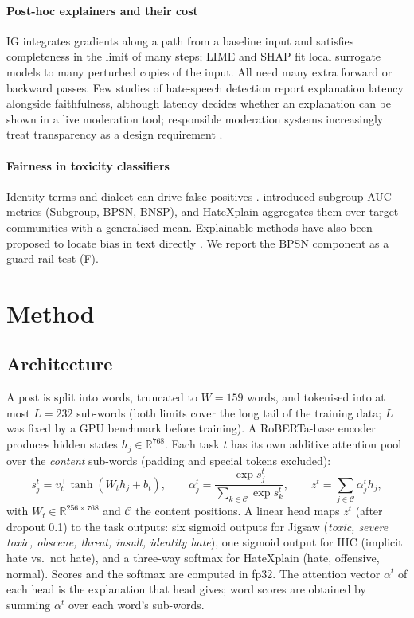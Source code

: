 \documentclass[preprint,12pt,authoryear]{elsarticle}
\begin{document}
\paragraph{Post-hoc explainers and their cost}
IG \citep{sundararajan2017axiomatic} integrates gradients along a path from a baseline input and satisfies completeness in the limit of many steps; LIME \citep{ribeiro2016lime} and SHAP \citep{lundberg2017unified} fit local surrogate models to many perturbed copies of the input. All need many extra forward or backward passes. Few studies of hate-speech detection report explanation latency alongside faithfulness, although latency decides whether an explanation can be shown in a live moderation tool; responsible moderation systems increasingly treat transparency as a design requirement \citep{asante2026responsible}.

\paragraph{Fairness in toxicity classifiers}
Identity terms and dialect can drive false positives \citep{dixon2018measuring,sap2019risk}. \citet{borkan2019nuanced} introduced subgroup AUC metrics (Subgroup, BPSN, BNSP), and HateXplain aggregates them over target communities with a generalised mean. Explainable methods have also been proposed to locate bias in text directly \citep{kurup2026explainable}. We report the BPSN component as a guard-rail test (F).

\section{Method}
\label{sec:method}

\subsection{Architecture}
A post is split into words, truncated to $W=159$ words, and tokenised into at most $L=232$ sub-words (both limits cover the long tail of the training data; $L$ was fixed by a GPU benchmark before training). A RoBERTa-base encoder produces hidden states $h_j \in \mathbb{R}^{768}$. Each task $t$ has its own additive attention pool over the \emph{content} sub-words (padding and special tokens excluded):
\begin{equation}
s^{t}_{j} = v_t^{\top}\tanh\!\left(W_t h_j + b_t\right), \qquad
\alpha^{t}_{j} = \frac{\exp s^{t}_{j}}{\sum_{k \in \mathcal{C}} \exp s^{t}_{k}}, \qquad
z^{t} = \sum_{j \in \mathcal{C}} \alpha^{t}_{j} h_j ,
\end{equation}
with $W_t \in \mathbb{R}^{256\times768}$ and $\mathcal{C}$ the content positions. A linear head maps $z^{t}$ (after dropout 0.1) to the task outputs: six sigmoid outputs for Jigsaw (\textit{toxic, severe toxic, obscene, threat, insult, identity hate}), one sigmoid output for IHC (implicit hate vs.\ not hate), and a three-way softmax for HateXplain (hate, offensive, normal). Scores and the softmax are computed in fp32. The attention vector $\alpha^{t}$ of each head is the explanation that head gives; word scores are obtained by summing $\alpha^{t}$ over each word's sub-words.
\end{document}
